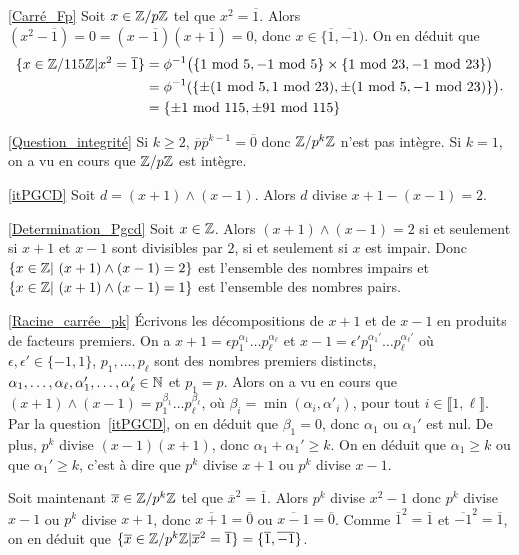 \documentclass[11pt,a4paper]{article}
\begin{document}
\eqref{Carré_Fp} Soit $x\in \mathbb{Z}/p\mathbb{Z}$ tel que $x^2=\overline{1}$. Alors $(x^2-\overline{1})=0=(x-\overline{1})(x+\overline{1})=0$, donc $x\in \{\overline{1},\overline{-1})$. On en déduit que \[\begin{aligned}\{x\in \Z/115\Z|x^2=\overline{1}\} &=\phi^{-1}\big(\{1\mathrm{\ mod\ }5,-1\mathrm{\ mod\ }5\}\times\{1\mathrm{\ mod\ }23,-1\mathrm{\ mod\ }23\}\big)\\ &=\phi^{-1}(\{\pm(1\mathrm{\ mod\ }5,1\mathrm{\ mod\ }23),\pm(1\mathrm{\ mod\ }5,-1\mathrm{\ mod\ }23)\}\big)\\
&= \{\pm 1\mathrm{\ mod\ }115,\pm 91\mathrm{\ mod\ }115\}\end{aligned}.\]

\eqref{Question_integrité} Si $k\geq 2$, $\overline{p}\overline{p}^{k-1}=\overline{0}$ donc $\mathbb{Z}/p^k\mathbb{Z}$ n'est pas intègre. Si $k=1$, on  a vu en cours que $\mathbb{Z}/p\mathbb{Z}$ est intègre.

\eqref{itPGCD} Soit $d=(x+1)\wedge (x-1)$. Alors $d$ divise $x+1-(x-1)=2$.

\eqref{Determination_Pgcd} Soit $x\in \mathbb{Z}$. Alors $(x+1)\wedge (x-1)=2$ si et seulement si $x+1$ et $x-1$ sont divisibles par $2$, si et seulement si $x$ est impair. Donc $\{x\in \mathbb{Z}|\ (x+1)\wedge (x-1)=2\}$ est l'ensemble des nombres impairs et $\{x\in \mathbb{Z}|\ (x+1)\wedge (x-1)=1\}$ est l'ensemble des nombres pairs.


\eqref{Racine_carrée_pk} Écrivons les décompositions de $x+1$ et de $x-1$ en produits de facteurs premiers. On a $x+1=\epsilon p_1^{\alpha_1}\ldots p_\ell^{\alpha_\ell}$ et $x-1=\epsilon' p_1^{\alpha_1'}\ldots p_\ell^{\alpha_\ell'}$ où $\epsilon,\epsilon'\in \{-1,1\}$, $p_1,\ldots,p_\ell$ sont des nombres premiers distincts, $\alpha_1,\ldots,\alpha_\ell,\alpha_1',\ldots,\alpha_\ell'\in \mathbb{N}$ et $p_1=p$. Alors on a vu en cours que $(x+1)\wedge (x-1)=p_1^{\beta_1}\ldots p_\ell^{\beta_\ell}$, où $\beta_i=\min (\alpha_i,\alpha'_i)$, pour tout $i\in \llbracket 1,\ell\rrbracket$. Par la question~\ref{itPGCD}, on en déduit que $\beta_1=0$, donc $\alpha_1$ ou $\alpha_1'$ est nul. De plus, $p^k$ divise $(x-1)(x+1)$, donc $\alpha_1+\alpha_1'\geq k$. On en déduit que $\alpha_1\geq k$ ou que $\alpha_1'\geq k$, c'est à dire que $p^k$ divise $x+1$ ou $p^k$ divise $x-1$.  

Soit maintenant $\overline{x}\in \mathbb{Z}/p^k\mathbb{Z}$ tel que $\overline{x}^2=\overline{1}$. Alors $p^k$ divise $x^2-1$ donc $p^k$ divise $x-1$ ou $p^k$ divise $x+1$, donc $\overline{x+1}=\overline{0}$ ou $\overline{x-1}=\overline{0}$. Comme $\overline{1}^2=\overline{1}$ et $\overline{-1}^2=\overline{1}$, on en déduit que $\{\overline{x}\in \mathbb{Z}/p^k\mathbb{Z}|\overline{x}^2=\overline{1}\}=\{\overline{1},\overline{-1}\}$. 
\end{document}
